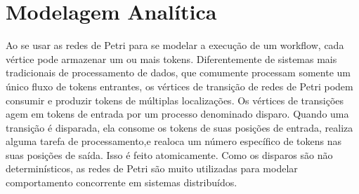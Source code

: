\section{Modelagem Analítica}
	
	Ao se usar as redes de Petri para se modelar a execução de um workflow, cada
vértice pode armazenar um ou mais tokens. Diferentemente de sistemas mais tradicionais de processamento de dados, que comumente processam somente um único
fluxo de tokens entrantes, os vértices de transição de redes de Petri podem consumir e produzir tokens de múltiplas localizações. Os vértices de transições agem em tokens de entrada por um processo denominado disparo. Quando uma transição é disparada, ela consome os tokens de suas posições de entrada, realiza alguma tarefa de processamento,e realoca um número específico de tokens nas suas posições de saída. Isso é feito atomicamente. Como os disparos são não determinísticos, as redes de Petri são muito utilizadas para modelar comportamento concorrente em sistemas distribuídos.

